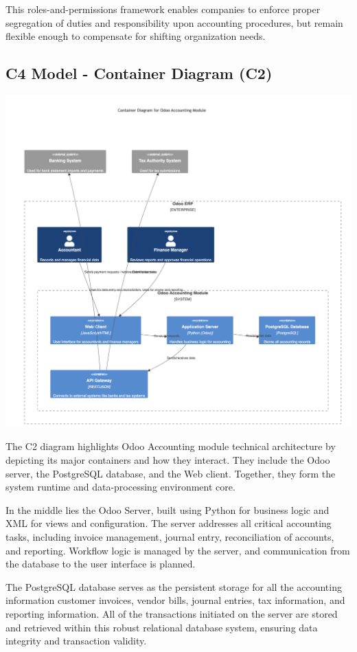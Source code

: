 \documentclass[11pt,a4paper]{article}
\begin{document}
\noindent This roles-and-permissions framework enables companies to enforce proper segregation of duties and responsibility upon accounting procedures, but remain flexible enough to compensate for shifting organization needs.

\subsection{C4 Model - Container Diagram (C2)}
\begin{center}
    \includegraphics[width=0.8\linewidth]{diagram/C2.png}
\end{center}

\noindent The C2 diagram highlights Odoo Accounting module technical architecture by depicting its major containers and how they interact. They include the Odoo server, the PostgreSQL database, and the Web client. Together, they form the system runtime and data-processing environment core.
\medskip

\noindent In the middle lies the Odoo Server, built using Python for business logic and XML for views and configuration. The server addresses all critical accounting tasks, including invoice management, journal entry, reconciliation of accounts, and reporting. Workflow logic is managed by the server, and communication from the database to the user interface is planned.
\medskip

\noindent The PostgreSQL database serves as the persistent storage for all the accounting information customer invoices, vendor bills, journal entries, tax information, and reporting information. All of the transactions initiated on the server are stored and retrieved within this robust relational database system, ensuring data integrity and transaction validity.
\medskip
\end{document}
